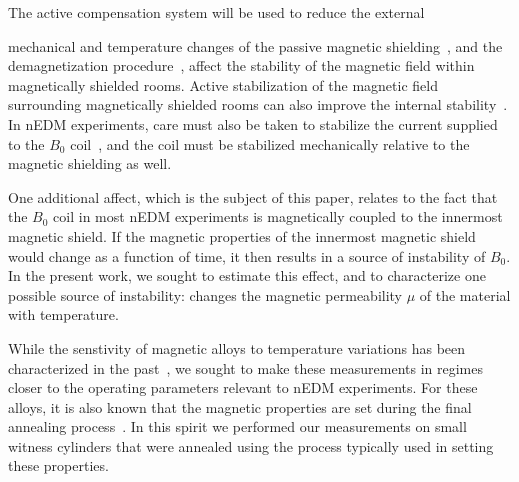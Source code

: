 \documentclass[review]{elsarticle}
\begin{document}
%
The active compensation system will be used to reduce the external

mechanical and temperature changes of the passive magnetic
shielding~\cite{bib:voigt,bib:thiel}, and the demagnetization
procedure~\cite{bib:thiel,bib:fierlinger2016}, affect the stability of
the magnetic field within magnetically shielded
rooms.
Active stabilization of the magnetic field surrounding magnetically
shielded rooms can also improve the internal
stability~\cite{bib:franke,bib:voigt, bib:afach}.  In nEDM
experiments, care must also be taken to stabilize the current supplied
to the $B_0$ coil~\cite{bib:brys}, and the coil must be stabilized
mechanically relative to the magnetic shielding as well.



One additional affect, which is the subject of this paper, relates to
the fact that the $B_0$ coil in most nEDM experiments is magnetically
coupled to the innermost magnetic shield.  If the magnetic properties
of the innermost magnetic shield would change as a function of time,
it then results in a source of instability of $B_0$.  In the present
work, we sought to estimate this effect, and to characterize one
possible source of instability: changes the magnetic permeability
$\mu$ of the material with temperature.

While the senstivity of magnetic alloys to temperature variations has
been characterized in the past~\cite{bib:couderchon,bib:kruppvdm}, we
sought to make these measurements in regimes closer to the operating
parameters relevant to nEDM experiments.  For these alloys, it is also
known that the magnetic properties are set during the final annealing
process~\cite{bib:gupta,bib:bozorth,bib:kruppvdm}.  In this spirit we
performed our measurements on small witness cylinders that were
annealed using the process typically used in setting these properties.

\end{document}
